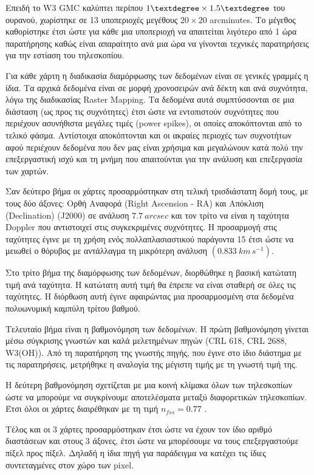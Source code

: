 \documentclass[a4paper,12pt]{memoir}
\begin{document}
Επειδή το W3 GMC καλύπτει περίπου $1 \textdegree \times 1.5 \textdegree$ του ουρανού, χωρίστηκε σε 13 υποπεριοχές μεγέθους $20 \times 20$ arcminutes. Το μέγεθος καθορίστηκε έτσι ώστε για κάθε μια υποπεριοχή να απαιτείται λιγότερο από 1 ώρα παρατήρησης καθώς είναι απαραίτητο ανά μια ώρα να γίνονται τεχνικές παρατηρήσεις για την εστίαση του τηλεσκοπίου. 

Για κάθε χάρτη η διαδικασία διαμόρφωσης των δεδομένων είναι σε γενικές γραμμές η ίδια. Τα αρχικά δεδομένα είναι σε μορφή χρονοσειρών ανά δέκτη και ανά συχνότητα, λόγω της διαδικασίας Raster Mapping. Τα δεδομένα αυτά συμπτύσσονται σε μια διάσταση (ως προς τις συχνότητες) έτσι ώστε να εντοπιστούν συχνότητες που περιέχουν ασυνήθιστα μεγάλες τιμές (power spikes), οι οποίες αποκόπτονται από το τελικό φάσμα. Αντίστοιχα αποκόπτονται και οι ακραίες περιοχές των συχνοτήτων αφού περιέχουν δεδομένα που δεν μας είναι χρήσιμα και μεγαλώνουν κατά πολύ την επεξεργαστική ισχύ και τη μνήμη που απαιτούνται για την ανάλυση και επεξεργασία των χαρτών.

Σαν δεύτερο βήμα οι χάρτες προσαρμόστηκαν στη τελική τρισδιάστατη δομή τους, με τους δύο άξονες: Ορθή Αναφορά (Right Ascension - RA) και Απόκλιση (Declination) (J2000) σε ανάλυση $7.7\ arcsec$ και τον τρίτο να είναι η ταχύτητα Doppler που αντιστοιχεί στις συγκεκριμένες συχνότητες. Η προσαρμογή στις ταχύτητες έγινε με τη χρήση ενός πολλαπλασιαστικού παράγοντα 15 έτσι ώστε να μειωθεί ο θόρυβος με αντάλλαγμα τη μικρότερη ανάλυση $(0.833\ km\, s^{-1})$. 

Στο τρίτο βήμα της διαμόρφωσης των δεδομένων, διορθώθηκε η βασική κατώτατη τιμή ανά ταχύτητα. Η κατώτατη αυτή τιμή θα έπρεπε να είναι σταθερή σε όλες τις ταχύτητες. Η διόρθωση αυτή έγινε αφαιρώντας μια προσαρμοσμένη στα δεδομένα πολυωνυμική καμπύλη τρίτου βαθμού.

Τελευταίο βήμα είναι η βαθμονόμηση των δεδομένων. Η πρώτη βαθμονόμηση γίνεται μέσω σύγκρισης γνωστών και καλά μελετημένων πηγών (CRL 618, CRL 2688, W3(OH)). Από τη παρατήρηση της γνωστής πηγής, που έγινε στο ίδιο διάστημα με τις παρατηρήσεις, μετρήθηκε η αναλογία της μέγιστη τιμής με τη γνωστή τιμή της. 

Η δεύτερη βαθμονόμηση σχετίζεται με μια κοινή κλίμακα όλων των τηλεσκοπίων ώστε να μπορούμε να συγκρίνουμε αποτελέσματα μεταξύ διαφορετικών τηλεσκοπίων. Έτσι όλοι οι χάρτες διαιρέθηκαν με τη τιμή $n_{fss}=0.77$ \cite{buckle_:_2009}. 

Τέλος και οι 3 χάρτες προσαρμόστηκαν έτσι ώστε να έχουν τον ίδιο αριθμό διαστάσεων και στους 3 άξονες, έτσι ώστε να μπορέσουμε να τους επεξεργαστούμε πίξελ προς πίξελ. Δηλαδή η ίδια πηγή για παράδειγμα να κατέχει τις ίδιες συντεταγμένες στον χώρο των pixel.
\end{document}

